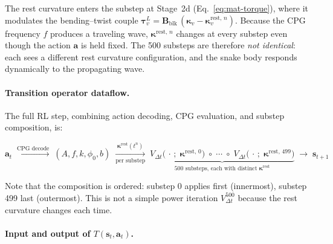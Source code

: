 \documentclass[11pt]{article}
\newcommand{\vect}[1]{\mathbf{#1}}
\newcommand{\mat}[1]{\mathbf{#1}}
\begin{document}
\noindent
The rest curvature enters the substep at Stage~2d (Eq.~\ref{eq:mat-torque}), where it modulates the bending--twist couple $\bm{\tau}_v^L = \mat{B}_{\text{blk}}\,(\bm{\kappa}_v - \bm{\kappa}_v^{\text{rest},\,n})$.
Because the CPG frequency $f$ produces a traveling wave, $\bm{\kappa}^{\text{rest},\,n}$ changes at every substep even though the action $\vect{a}$ is held fixed.
The 500 substeps are therefore \emph{not identical}: each sees a different rest curvature configuration, and the snake body responds dynamically to the propagating wave.

\paragraph{Transition operator dataflow.}
The full RL step, combining action decoding, CPG evaluation, and substep composition, is:

\begin{equation}
  \vect{a}_t
  \;\xrightarrow{\text{CPG decode}}\;
  (A, f, k, \phi_0, b)
  \;\xrightarrow[\text{per substep}]{\bm{\kappa}^{\text{rest}}(t^n)}\;
  \underbrace{V_{\Delta t}\bigl(\,\cdot\,;\;\bm{\kappa}^{\text{rest},\,0}\bigr)
    \;\circ\; \cdots \;\circ\;
    V_{\Delta t}\bigl(\,\cdot\,;\;\bm{\kappa}^{\text{rest},\,499}\bigr)}_{500 \text{ substeps, each with distinct } \bm{\kappa}^{\text{rest}}}
  \;\longrightarrow\;
  \vect{s}_{t+1}
  \label{eq:rl-step-dataflow}
\end{equation}

\noindent
Note that the composition is ordered: substep 0 applies first (innermost), substep 499 last (outermost).
This is not a simple power iteration $V_{\Delta t}^{500}$ because the rest curvature changes each time.

\paragraph{Input and output of $T(\vect{s}_t, \vect{a}_t)$.}
\end{document}
